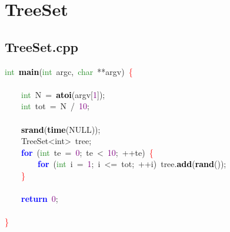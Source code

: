 \section{TreeSet}
\subsection{TreeSet.cpp}
\noindent
\mbox{}\textcolor{ForestGreen}{int}\ \textbf{\textcolor{Black}{main}}\textcolor{BrickRed}{(}\textcolor{ForestGreen}{int}\ argc\textcolor{BrickRed}{,}\ \textcolor{ForestGreen}{char}\ \textcolor{BrickRed}{**}argv\textcolor{BrickRed}{)}\ \textcolor{Red}{\{} \\
\mbox{} \\
\mbox{}\ \ \ \ \textcolor{ForestGreen}{int}\ N\ \textcolor{BrickRed}{=}\ \textbf{\textcolor{Black}{atoi}}\textcolor{BrickRed}{(}argv\textcolor{BrickRed}{[}\textcolor{Purple}{1}\textcolor{BrickRed}{]);} \\
\mbox{}\ \ \ \ \textcolor{ForestGreen}{int}\ tot\ \textcolor{BrickRed}{=}\ N\ \textcolor{BrickRed}{/}\ \textcolor{Purple}{10}\textcolor{BrickRed}{;} \\
\mbox{} \\
\mbox{}\ \ \ \ \textbf{\textcolor{Black}{srand}}\textcolor{BrickRed}{(}\textbf{\textcolor{Black}{time}}\textcolor{BrickRed}{(}NULL\textcolor{BrickRed}{));} \\
\mbox{}\ \ \ \ \textcolor{TealBlue}{TreeSet\textless{}int\textgreater{}}\ tree\textcolor{BrickRed}{;} \\
\mbox{}\ \ \ \ \textbf{\textcolor{Blue}{for}}\ \textcolor{BrickRed}{(}\textcolor{ForestGreen}{int}\ te\ \textcolor{BrickRed}{=}\ \textcolor{Purple}{0}\textcolor{BrickRed}{;}\ te\ \textcolor{BrickRed}{\textless{}}\ \textcolor{Purple}{10}\textcolor{BrickRed}{;}\ \textcolor{BrickRed}{++}te\textcolor{BrickRed}{)}\ \textcolor{Red}{\{} \\
\mbox{}\ \ \ \ \ \ \ \ \textbf{\textcolor{Blue}{for}}\ \textcolor{BrickRed}{(}\textcolor{ForestGreen}{int}\ i\ \textcolor{BrickRed}{=}\ \textcolor{Purple}{1}\textcolor{BrickRed}{;}\ i\ \textcolor{BrickRed}{\textless{}=}\ tot\textcolor{BrickRed}{;}\ \textcolor{BrickRed}{++}i\textcolor{BrickRed}{)}\ tree\textcolor{BrickRed}{.}\textbf{\textcolor{Black}{add}}\textcolor{BrickRed}{(}\textbf{\textcolor{Black}{rand}}\textcolor{BrickRed}{());} \\
\mbox{}\ \ \ \ \textcolor{Red}{\}} \\
\mbox{} \\
\mbox{}\ \ \ \ \textbf{\textcolor{Blue}{return}}\ \textcolor{Purple}{0}\textcolor{BrickRed}{;} \\
\mbox{} \\
\mbox{}\textcolor{Red}{\}} \\
\mbox{}

